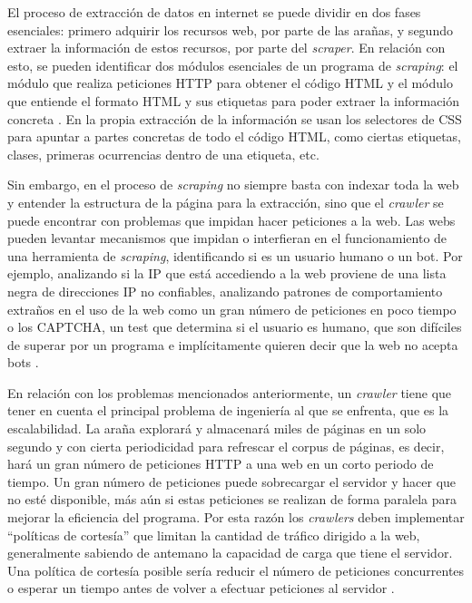 El proceso de extracción de datos en internet se puede dividir en dos fases
esenciales: primero adquirir los recursos web, por parte de las arañas, y
segundo extraer la información de estos recursos, por parte del
\textit{scraper}. En relación con esto, se pueden identificar dos módulos
esenciales de un programa de \textit{scraping}: el módulo que realiza peticiones
HTTP para obtener el código HTML y el módulo que entiende el formato HTML y sus
etiquetas para poder extraer la información concreta \cite{zhao2017web}. En la
propia extracción de la información se usan los selectores de CSS para apuntar a
partes concretas de todo el código HTML, como ciertas etiquetas, clases,
primeras ocurrencias dentro de una etiqueta, etc. \cite{scraperworld}

Sin embargo, en el proceso de \textit{scraping} no siempre basta con indexar
toda la web y entender la estructura de la página para la extracción, sino que
el \textit{crawler} se puede encontrar con problemas que impidan hacer
peticiones a la web. Las webs pueden levantar mecanismos que impidan o
interfieran en el funcionamiento de una herramienta de \textit{scraping},
identificando si es un usuario humano o un bot. Por ejemplo, analizando si la IP
que está accediendo a la web proviene de una lista negra de direcciones IP no
confiables, analizando patrones de comportamiento extraños en el uso de la web
como un gran número de peticiones en poco tiempo \cite{zhao2017web} o los
CAPTCHA, un test que determina si el usuario es humano, que son difíciles de
superar por un programa e implícitamente quieren decir que la web no acepta bots
\cite{apress2018scraping}. 

En relación con los problemas mencionados anteriormente, un \textit{crawler}
tiene que tener en cuenta el principal problema de ingeniería al que se
enfrenta, que es la escalabilidad. La araña explorará y almacenará miles de
páginas en un solo segundo y con cierta periodicidad para refrescar el corpus de
páginas, es decir, hará un gran número de peticiones HTTP a una web en un corto
periodo de tiempo. Un gran número de peticiones puede sobrecargar el servidor y
hacer que no esté disponible, más aún si estas peticiones se realizan de forma
paralela para mejorar la eficiencia del programa. Por esta razón los
\textit{crawlers} deben implementar ``políticas de cortesía'' que limitan la
cantidad de tráfico dirigido a la web, generalmente sabiendo de antemano la
capacidad de carga que tiene el servidor. Una política de cortesía posible sería
reducir el número de peticiones concurrentes o esperar un tiempo antes de volver
a efectuar peticiones al servidor \cite{najork2009web}.

